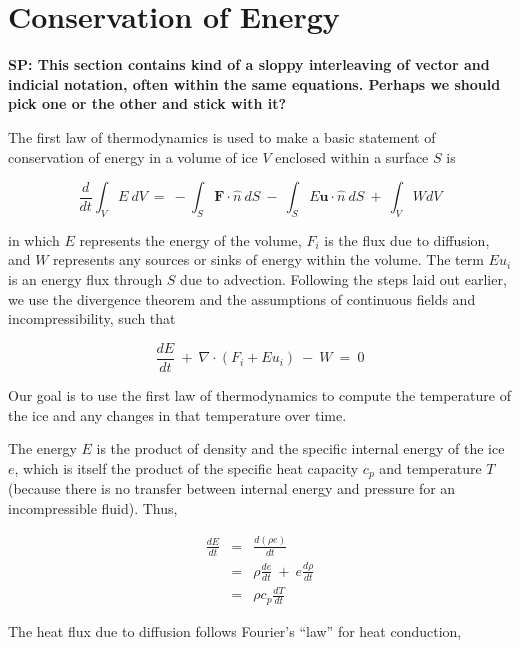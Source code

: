 \section{Conservation of Energy}
\textbf{SP: This section contains kind of a sloppy interleaving of vector and indicial notation, often within the same
equations. Perhaps we should pick one or the other and stick with it?}

The first law of thermodynamics is used to make a basic statement of conservation of energy in a volume of ice $V$ enclosed within a surface $S$ is

\begin{equation}
\frac{d}{d t} \int_{V}E ~dV~=~- \int_{S}\mathbf{F}\cdot \hat{n}~dS~-~\int_{S}E \mathbf{u}\cdot \hat{n}~dS~+~\int_{V}W dV
\label{eq:enbal1}
\end{equation}

in which $E$ represents the energy of the volume, $F_{i}$ is the flux due
to diffusion, and $W$ represents any sources or sinks of energy within
the volume. The term $Eu_{i}$ is an energy flux through $S$ due to advection.
Following the steps laid out earlier, we use the divergence theorem and
the assumptions of continuous fields and incompressibility, such that

\begin{equation}
\frac{dE}{dt}~+~\nabla \cdot \left(F_{i} +E u_{i}  \right)~-~W~=~0
\label{eq:enbal2}
\end{equation}

Our goal is to use the first law of thermodynamics to compute the temperature of the ice and any changes in that temperature over time.

The energy $E$ is the product of density and the specific internal
energy of the ice $e$, which is itself the product of the specific heat
capacity $c_{p}$ and temperature $T$ (because there is no transfer
between internal energy and pressure for an incompressible fluid). Thus,

\begin{equation}
\begin{matrix}
\frac{dE}{dt}&=&\frac{d\left(\rho e \right)}{dt} \\
&=&\rho\frac{de}{dt}~+~e \frac{d\rho}{dt}\\
&=&\rho c_{p} \frac{dT}{dt}
\end{matrix}
\label{eq:enbal3}
\end{equation}

The heat flux due to diffusion follows Fourier's ``law'' for heat conduction,

